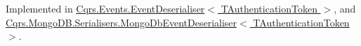 Implemented in \hyperlink{classCqrs_1_1Events_1_1EventDeserialiser_a193feac1d58446f0a7447d8ba04179fc_a193feac1d58446f0a7447d8ba04179fc}{Cqrs.\+Events.\+Event\+Deserialiser$<$ T\+Authentication\+Token $>$}, and \hyperlink{classCqrs_1_1MongoDB_1_1Serialisers_1_1MongoDbEventDeserialiser_a2ea63367d97bf66e3dffcabb8c53005e_a2ea63367d97bf66e3dffcabb8c53005e}{Cqrs.\+Mongo\+D\+B.\+Serialisers.\+Mongo\+Db\+Event\+Deserialiser$<$ T\+Authentication\+Token $>$}.

